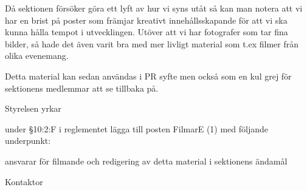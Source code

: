 \documentclass[../_main/handlingar.tex]{subfiles}
\begin{document}
Då sektionen försöker göra ett lyft av hur vi syns utåt så kan man notera att vi har en brist på poster som främjar kreativt innehållsskapande för att vi ska kunna hålla tempot i utvecklingen. Utöver att vi har fotografer som tar fina bilder, 
så hade det även varit bra med mer livligt material som t.ex filmer från olika evenemang. 

Detta material kan sedan användas i PR syfte men också som en kul grej för sektionens medlemmar att se tillbaka på.

Styrelsen yrkar

\begin{attsatser}
\att under §10:2:F i reglementet lägga till posten FilmarE (1) med följande underpunkt:
\begin{dashlist}
\item ansvarar för filmande och redigering av detta material i sektionens ändamål 
\end{dashlist}

\end{attsatser}

\begin{signatures}{1}
    \ist
    \signature{\sekr}{Kontaktor}
\end{signatures}
\end{document}
